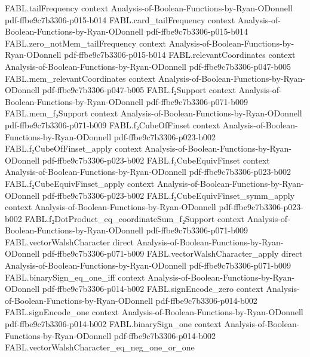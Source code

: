 \begin{theorem}
\proofstep
  {FABL.tailFrequency}
  {context}
  {Analysis-of-Boolean-Functions-by-Ryan-ODonnell}
  {pdf-ffbe9c7b3306-p015-b014}
\proofstep
  {FABL.card_tailFrequency}
  {context}
  {Analysis-of-Boolean-Functions-by-Ryan-ODonnell}
  {pdf-ffbe9c7b3306-p015-b014}
\proofstep
  {FABL.zero_notMem_tailFrequency}
  {context}
  {Analysis-of-Boolean-Functions-by-Ryan-ODonnell}
  {pdf-ffbe9c7b3306-p015-b014}
\proofstep
  {FABL.relevantCoordinates}
  {context}
  {Analysis-of-Boolean-Functions-by-Ryan-ODonnell}
  {pdf-ffbe9c7b3306-p047-b005}
\proofstep
  {FABL.mem_relevantCoordinates}
  {context}
  {Analysis-of-Boolean-Functions-by-Ryan-ODonnell}
  {pdf-ffbe9c7b3306-p047-b005}
\proofstep
  {FABL.f₂Support}
  {context}
  {Analysis-of-Boolean-Functions-by-Ryan-ODonnell}
  {pdf-ffbe9c7b3306-p071-b009}
\proofstep
  {FABL.mem_f₂Support}
  {context}
  {Analysis-of-Boolean-Functions-by-Ryan-ODonnell}
  {pdf-ffbe9c7b3306-p071-b009}
\proofstep
  {FABL.f₂CubeOfFinset}
  {context}
  {Analysis-of-Boolean-Functions-by-Ryan-ODonnell}
  {pdf-ffbe9c7b3306-p023-b002}
\proofstep
  {FABL.f₂CubeOfFinset_apply}
  {context}
  {Analysis-of-Boolean-Functions-by-Ryan-ODonnell}
  {pdf-ffbe9c7b3306-p023-b002}
\proofstep
  {FABL.f₂CubeEquivFinset}
  {context}
  {Analysis-of-Boolean-Functions-by-Ryan-ODonnell}
  {pdf-ffbe9c7b3306-p023-b002}
\proofstep
  {FABL.f₂CubeEquivFinset_apply}
  {context}
  {Analysis-of-Boolean-Functions-by-Ryan-ODonnell}
  {pdf-ffbe9c7b3306-p023-b002}
\proofstep
  {FABL.f₂CubeEquivFinset_symm_apply}
  {context}
  {Analysis-of-Boolean-Functions-by-Ryan-ODonnell}
  {pdf-ffbe9c7b3306-p023-b002}
\proofstep
  {FABL.f₂DotProduct_eq_coordinateSum_f₂Support}
  {context}
  {Analysis-of-Boolean-Functions-by-Ryan-ODonnell}
  {pdf-ffbe9c7b3306-p071-b009}
\proofstep
  {FABL.vectorWalshCharacter}
  {direct}
  {Analysis-of-Boolean-Functions-by-Ryan-ODonnell}
  {pdf-ffbe9c7b3306-p071-b009}
\proofstep
  {FABL.vectorWalshCharacter_apply}
  {direct}
  {Analysis-of-Boolean-Functions-by-Ryan-ODonnell}
  {pdf-ffbe9c7b3306-p071-b009}
\proofstep
  {FABL.binarySign_eq_one_iff}
  {context}
  {Analysis-of-Boolean-Functions-by-Ryan-ODonnell}
  {pdf-ffbe9c7b3306-p014-b002}
\proofstep
  {FABL.signEncode_zero}
  {context}
  {Analysis-of-Boolean-Functions-by-Ryan-ODonnell}
  {pdf-ffbe9c7b3306-p014-b002}
\proofstep
  {FABL.signEncode_one}
  {context}
  {Analysis-of-Boolean-Functions-by-Ryan-ODonnell}
  {pdf-ffbe9c7b3306-p014-b002}
\proofstep
  {FABL.binarySign_one}
  {context}
  {Analysis-of-Boolean-Functions-by-Ryan-ODonnell}
  {pdf-ffbe9c7b3306-p014-b002}
\proofstep
  {FABL.vectorWalshCharacter_eq_neg_one_or_one}

\end{theorem}
